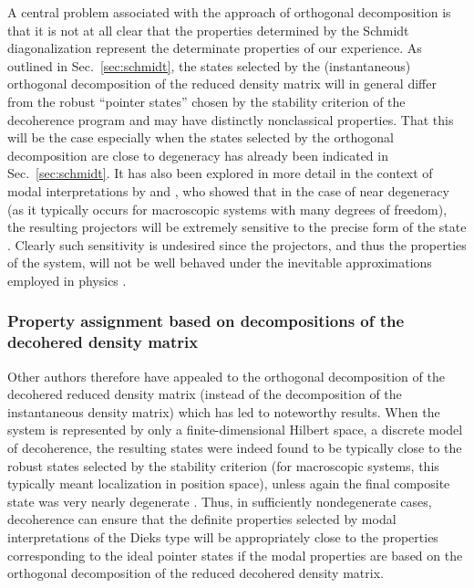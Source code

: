 \documentclass[twocolumn,rmp,aps,amsmath,amsfonts,noshowkeys,noshowpacs]{revtex4}
\begin{document}
A central problem associated with the approach of orthogonal
decomposition is that it is not at all clear that the properties
determined by the Schmidt diagonalization represent the determinate
properties of our experience. As outlined in Sec.~\ref{sec:schmidt},
the states selected by the (instantaneous) orthogonal decomposition of
the reduced density matrix will in general differ from the robust
``pointer states'' chosen by the stability criterion of the
decoherence program and may have distinctly nonclassical properties.
That this will be the case especially when the states selected by the
orthogonal decomposition are close to degeneracy has already been
indicated in Sec.~\ref{sec:schmidt}. It has also been explored in more
detail in the context of modal interpretations by
\citet{Bacciagaluppi:1995:zx} and \citet{Donald:1998:xz}, who showed
that in the case of near degeneracy (as it typically occurs for
macroscopic systems with many degrees of freedom), the resulting
projectors will be extremely sensitive to the precise form of the
state \citep{Bacciagaluppi:1995:zx}. Clearly such sensitivity is 
undesired since the projectors, and thus the properties of the system,
will not be well behaved under the inevitable approximations employed
in physics \citep{Donald:1998:xz}.


\subsubsection{Property assignment based on decompositions of the decohered density matrix}

Other authors therefore have appealed to the orthogonal decomposition
of the decohered reduced density matrix (instead of the decomposition
of the instantaneous density matrix) which has led to noteworthy
results.  When the system is represented by only a finite-dimensional
Hilbert space, a discrete model of decoherence, the resulting states
were indeed found to be typically close to the robust states selected
by the stability criterion (for macroscopic systems, this typically
meant localization in position space), unless again the final
composite state was very nearly degenerate
\citetext{\citealp{Bacciagaluppi:1996:po,Bene:2001:po}; see also
  Sec.~\ref{sec:schmidt}}. Thus, in sufficiently nondegenerate cases,
decoherence can ensure that the definite properties selected by modal
interpretations of the Dieks type will be appropriately close to the
properties corresponding to the ideal pointer states if the modal
properties are based on the orthogonal decomposition of the reduced
decohered density matrix.
\end{document}

